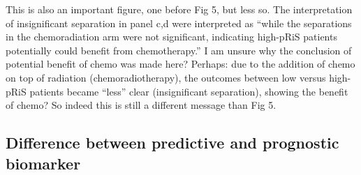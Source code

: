 \documentclass{article}%
\begin{document}
\newline%
\newline%
%
%
\newline%
\newline%
%
This is also an important figure, one before Fig 5, but less so. The interpretation of insignificant separation in panel c,d were interpreted as “while the separations in the chemoradiation arm were not significant, indicating high{-}pRiS patients potentially could benefit from chemotherapy.” I am unsure why the conclusion of potential benefit of chemo was made here? %
\newline%
\newline%
%
Perhaps: due to the addition of chemo on top of radiation (chemoradiotherapy), the outcomes between low versus high{-}pRiS patients became “less” clear (insignificant separation), showing the benefit of chemo? %
\newline%
\newline%
%
So indeed this is still a different message than Fig 5. %
\newline%
\newline%
%
\subsection{Difference between predictive and prognostic biomarker}%
\label{subsec:Differencebetweenpredictiveandprognosticbiomarker}%
\end{document}
